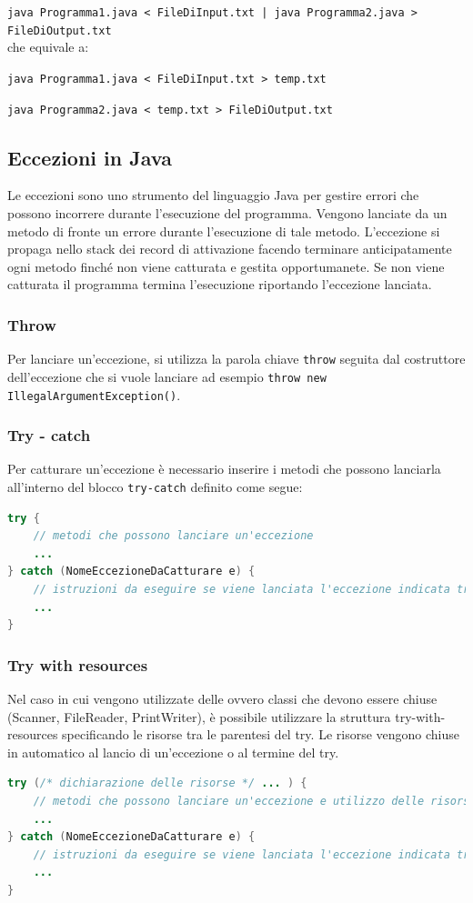 \documentclass{article}
\begin{document}
\verb=java Programma1.java < FileDiInput.txt | java Programma2.java > FileDiOutput.txt=
\\
che equivale a:

\verb|java Programma1.java < FileDiInput.txt > temp.txt|

\verb|java Programma2.java < temp.txt > FileDiOutput.txt|

\newpage


\subsection{Eccezioni in Java}
Le eccezioni sono uno strumento del linguaggio Java per gestire errori che possono incorrere durante l'esecuzione del programma.
Vengono lanciate da un metodo di fronte un errore durante l'esecuzione di tale metodo. L'eccezione si propaga nello stack dei record
di attivazione facendo terminare anticipatamente ogni metodo finché non viene catturata e gestita opportumanete.
Se non viene catturata il programma termina l'esecuzione riportando l'eccezione lanciata.

\subsubsection*{Throw}
Per lanciare un'eccezione, si utilizza la parola chiave \verb|throw| seguita dal costruttore dell'eccezione che si vuole lanciare
ad esempio \verb|throw new IllegalArgumentException()|.

\subsubsection*{Try - catch}
Per catturare un'eccezione è necessario inserire i metodi che possono lanciarla all'interno del blocco \verb|try-catch|
definito come segue:
\begin{lstlisting}[language=Java]
try {
	// metodi che possono lanciare un'eccezione
	...
} catch (NomeEccezioneDaCatturare e) {
	// istruzioni da eseguire se viene lanciata l'eccezione indicata tra parentesi
	...
}
\end{lstlisting}

\subsubsection*{Try with resources}
Nel caso in cui vengono utilizzate delle  ovvero classi che devono essere chiuse (Scanner, FileReader, PrintWriter),
è possibile utilizzare la struttura try-with-resources specificando le risorse tra le parentesi del try. Le risorse vengono chiuse
in automatico al lancio di un'eccezione o al termine del try.
\begin{lstlisting}[language=Java]
try (/* dichiarazione delle risorse */ ... ) {
	// metodi che possono lanciare un'eccezione e utilizzo delle risorse
	...
} catch (NomeEccezioneDaCatturare e) {
	// istruzioni da eseguire se viene lanciata l'eccezione indicata tra parentesi
	...
}
\end{lstlisting}
\end{document}
